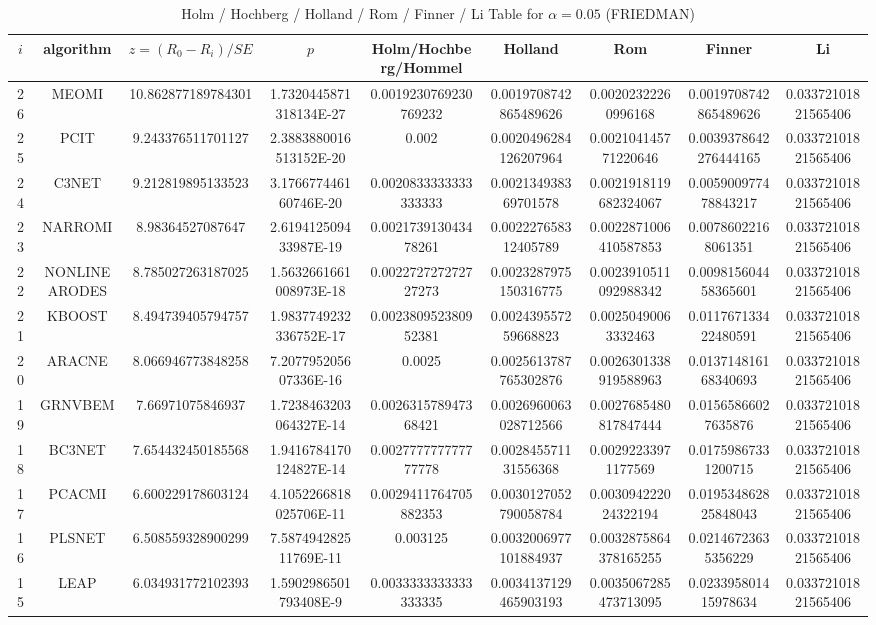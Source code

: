 \documentclass[a4paper,10pt]{article}
\begin{document}
\begin{landscape}
\newpage

\begin{table}[!htp]
\centering\scriptsize
\caption{Holm / Hochberg / Holland / Rom / Finner / Li Table for $\alpha=0.05$ (FRIEDMAN)}
\begin{tabular}{ccccccccc}
$i$&algorithm&$z=(R_0 - R_i)/SE$&$p$&Holm/Hochberg/Hommel&Holland&Rom&Finner&Li\\
\hline
26&MEOMI&10.862877189784301&1.7320445871318134E-27&0.0019230769230769232&0.0019708742865489626&0.00202322260996168&0.0019708742865489626&0.03372101821565406\\
25&PCIT&9.243376511701127&2.3883880016513152E-20&0.002&0.0020496284126207964&0.002104145771220646&0.0039378642276444165&0.03372101821565406\\
24&C3NET&9.212819895133523&3.176677446160746E-20&0.0020833333333333333&0.002134938369701578&0.0021918119682324067&0.005900977478843217&0.03372101821565406\\
23&NARROMI&8.98364527087647&2.619412509433987E-19&0.002173913043478261&0.002227658312405789&0.0022871006410587853&0.00786022168061351&0.03372101821565406\\
22&NONLINEARODES&8.785027263187025&1.5632661661008973E-18&0.002272727272727273&0.0023287975150316775&0.0023910511092988342&0.009815604458365601&0.03372101821565406\\
21&KBOOST&8.494739405794757&1.9837749232336752E-17&0.002380952380952381&0.002439557259668823&0.00250490063332463&0.011767133422480591&0.03372101821565406\\
20&ARACNE&8.066946773848258&7.207795205607336E-16&0.0025&0.0025613787765302876&0.0026301338919588963&0.013714816168340693&0.03372101821565406\\
19&GRNVBEM&7.66971075846937&1.7238463203064327E-14&0.002631578947368421&0.0026960063028712566&0.0027685480817847444&0.01565866027635876&0.03372101821565406\\
18&BC3NET&7.654432450185568&1.9416784170124827E-14&0.002777777777777778&0.002845571131556368&0.00292233971177569&0.01759867331200715&0.03372101821565406\\
17&PCACMI&6.600229178603124&4.1052266818025706E-11&0.0029411764705882353&0.0030127052790058784&0.003094222024322194&0.019534862825848043&0.03372101821565406\\
16&PLSNET&6.508559328900299&7.587494282511769E-11&0.003125&0.0032006977101884937&0.0032875864378165255&0.02146723635356229&0.03372101821565406\\
15&LEAP&6.034931772102393&1.5902986501793408E-9&0.0033333333333333335&0.0034137129465903193&0.0035067285473713095&0.023395801415978634&0.03372101821565406\\

\end{tabular}
\end{table}
\end{landscape}
\end{document}
